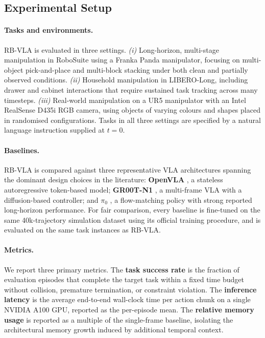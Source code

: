 \documentclass[12pt]{article}
\begin{document}
\subsection{Experimental Setup}
\label{subsec:exp_setup}

\paragraph{Tasks and environments.} RB-VLA is evaluated in three settings. \textit{(i)} Long-horizon, multi-stage manipulation in RoboSuite using a Franka Panda manipulator, focusing on multi-object pick-and-place and multi-block stacking under both clean and partially observed conditions. \textit{(ii)} Household manipulation in LIBERO-Long, including drawer and cabinet interactions that require sustained task tracking across many timesteps. \textit{(iii)} Real-world manipulation on a UR5 manipulator with an Intel RealSense D435i RGB camera, using objects of varying colours and shapes placed in randomised configurations. Tasks in all three settings are specified by a natural language instruction supplied at $t=0$.

\paragraph{Baselines.} RB-VLA is compared against three representative VLA architectures spanning the dominant design choices in the literature: \textbf{OpenVLA} \cite{kim2024openvla}, a stateless autoregressive token-based model; \textbf{GR00T-N1} \cite{bjorck2025gr00t}, a multi-frame VLA with a diffusion-based controller; and \textbf{$\pi_0$} \cite{black2025pi_}, a flow-matching policy with strong reported long-horizon performance. For fair comparison, every baseline is fine-tuned on the same 40k-trajectory simulation dataset using its official training procedure, and is evaluated on the same task instances as RB-VLA.

\paragraph{Metrics.} We report three primary metrics. The \textbf{task success rate} is the fraction of evaluation episodes that complete the target task within a fixed time budget without collision, premature termination, or constraint violation. The \textbf{inference latency} is the average end-to-end wall-clock time per action chunk on a single NVIDIA A100 GPU, reported as the per-episode mean. The \textbf{relative memory usage} is reported as a multiple of the single-frame baseline, isolating the architectural memory growth induced by additional temporal context.
\end{document}
